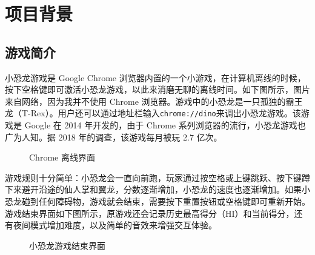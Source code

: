 \documentclass[hyperref,UTF8,12pt,a4paper]{ctexart}
\begin{document}
\hypertarget{ux9879ux76eeux80ccux666f}{%
\section{项目背景}\label{ux9879ux76eeux80ccux666f}}

\hypertarget{ux6e38ux620fux7b80ux4ecb}{%
\subsection{游戏简介}\label{ux6e38ux620fux7b80ux4ecb}}

小恐龙游戏是 Google Chrome
浏览器内置的一个小游戏，在计算机离线的时候，按下空格键即可激活小恐龙游戏，以此来消磨无聊的离线时间。如下图所示，图片来自网络，因为我并不使用
Chrome
浏览器。游戏中的小恐龙是一只孤独的霸王龙（T-Rex）。用户还可以通过地址栏输入\texttt{chrome://dino}来调出小恐龙游戏。该游戏是
Google 在 2014 年开发的，由于 Chrome
系列浏览器的流行，小恐龙游戏也广为人知。据 2018 年的调查，该游戏每月被玩
2.7 亿次。

\begin{figure}[H]
\centering
{}
\caption{Chrome 离线界面}
\end{figure}

游戏规则十分简单：小恐龙会一直向前跑，玩家通过按空格或上键跳跃、按下键蹲下来避开沿途的仙人掌和翼龙，分数逐渐增加，小恐龙的速度也逐渐增加。如果小恐龙碰到任何障碍物，游戏就会结束，需要按下重置按钮或空格键即可重新开始。游戏结束界面如下图所示，原游戏还会记录历史最高得分（HI）和当前得分，还有夜间模式增加难度，以及简单的音效来增强交互体验。

\begin{figure}[H]
\centering
{}
\caption{小恐龙游戏结束界面}
\end{figure}
\end{document}
